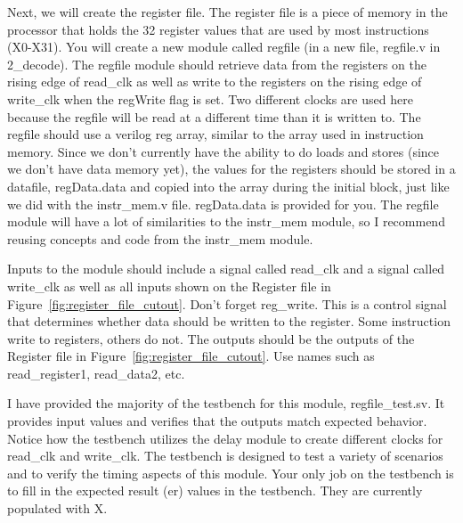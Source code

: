 Next, we will create the register file.  The register file is a piece of memory in the processor that holds the 32 register values that are used by most instructions (X0-X31).  You will create a new module called regfile (in a new file, regfile.v in 2\_decode).  The regfile module should retrieve data from the registers on the rising edge of read\_clk as well as write to the registers on the rising edge of write\_clk when the regWrite flag is set.  Two different clocks are used here because the regfile will be read at a different time than it is written to.  The regfile should use a verilog reg array, similar to the array used in instruction memory.  Since we don't currently have the ability to do loads and stores (since we don't have data memory yet), the values for the registers should be stored in a datafile, regData.data and copied into the array during the initial block, just like we did with the instr\_mem.v file.  regData.data is provided for you.  The regfile module will have a lot of similarities to the instr\_mem module, so I recommend reusing concepts and code from the instr\_mem module.

Inputs to the module should include a signal called read\_clk and a signal called write\_clk as well as all inputs shown on the Register file in Figure~\ref{fig:register_file_cutout}.  Don't forget reg\_write.  This is a control signal that determines whether data should be written to the register.  Some instruction write to registers, others do not.  The outputs should be the outputs of the Register file in Figure~\ref{fig:register_file_cutout}.  Use names such as read\_register1, read\_data2, etc.

I have provided the majority of the testbench for this module, regfile\_test.sv.  It  provides input values and verifies that the outputs match expected behavior.  Notice how the testbench utilizes the delay module to create different clocks for read\_clk and write\_clk.  The testbench is designed to test a variety of scenarios and to verify the timing aspects of this module.  Your only job on the testbench is to fill in the expected result (er) values in the testbench.  They are currently populated with X.

